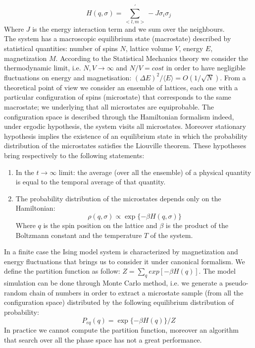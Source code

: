 \documentclass[11pt,a4paper]{article}
\begin{document}
\begin{equation}
  H(q, \sigma) = \sum_{<l,m>}^{'} -J\sigma_i\sigma_j
\end{equation}
Where $J$ is the energy interaction term and we sum over the neighbours.
\\
The system has  a macroscopic equilibrium state (macrostate) described by statistical quantities: number of spins $N$, lattice volume $V$, energy $E$, magnetization $M$. According to the Statistical Mechanics theory we consider the thermodynamic limit, i.e. $N, V \rightarrow \infty$ and $N/V = cost$ in order to have negligible fluctuations on energy and magnetisation: $(\Delta E)^2 / \langle E \rangle = O  (1/ \sqrt{N}) $.
From a theoretical point of view we consider an ensemble of lattices, each one with a particular configuration of spins (microstate) that corresponds to the same macrostate; we underlying that all microstates are equiprobable. The configuration space is described through the Hamiltonian formalism indeed, under ergodic hypothesis, the system visits all microstates. Moreover stationary hypothesis implies the existence of an equilibrium state in which  the probability distribution of the microstates satisfies the Liouville theorem. These hypotheses bring respectively to the following statements:

\begin{enumerate}
\item In the $t \rightarrow \infty$ limit: the average (over all the ensemble) of a physical quantity is equal to the temporal average of that quantity.
\item The probability distribution of the microstates depends only on the Hamiltonian:
  \begin{equation}
    \rho (q, \sigma ) \propto \exp \lbrace- \beta H(q, \sigma ) \rbrace
  \end{equation}
  Where $q$ is the spin position on the lattice and $\beta$ is the product of the Boltzmann constant and the temperature $T$ of the system.
\end{enumerate}


In a finite case the Ising model system is characterized by magnetization and  energy fluctuations that brings us to consider it under canonical formalism. We define the partition function as follow: $Z = \sum_q exp [  -\beta H(q) ]$. The model simulation can be done through Monte Carlo method, i.e. we generate a pseudo-random chain of numbers in order to extract a microstate sample (from all the configuration space) distributed by the following equilibrium distribution of probability:
\begin{equation}
  P_{eq}(q)=\exp \lbrace -\beta H(q)\rbrace /Z
\end{equation}
In practice we cannot compute the partition function, moreover an algorithm that search over all the phase space has not a great performance.
\end{document}

